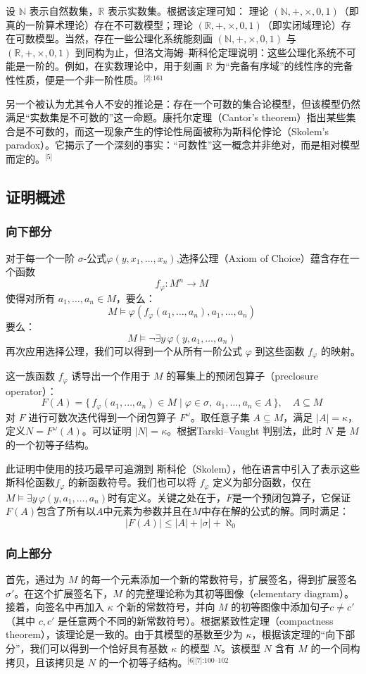 设 \(\mathbb{N}\) 表示自然数集，\(\mathbb{R}\) 表示实数集。根据该定理可知：
理论 \((\mathbb{N}, +, \times, 0, 1)\)（即真的一阶算术理论）存在不可数模型；理论 \((\mathbb{R}, +, \times, 0, 1)\)（即实闭域理论）存在可数模型。当然，存在一些公理化系统能刻画 \((\mathbb{N}, +, \times, 0, 1)\) 与 \((\mathbb{R}, +, \times, 0, 1)\) 到同构为止，但洛文海姆–斯科伦定理说明：这些公理化系统不可能是一阶的。例如，在实数理论中，用于刻画 \(\mathbb{R}\) 为“完备有序域”的线性序的完备性性质，便是一个非一阶性质。\(^\text{[2]:161}\)

另一个被认为尤其令人不安的推论是：存在一个可数的集合论模型，但该模型仍然满足“实数集是不可数的”这一命题。康托尔定理（Cantor’s theorem）指出某些集合是不可数的，而这一现象产生的悖论性局面被称为斯科伦悖论（Skolem’s paradox）。它揭示了一个深刻的事实：“可数性”这一概念并非绝对，而是相对模型而定的。\(^\text{[5]}\)
\subsection{证明概述}
\subsubsection{向下部分}
对于每一个一阶 \(\sigma\)-公式\(\varphi(y, x_1, \ldots, x_n)\),选择公理（Axiom of Choice）蕴含存在一个函数  
\[
f_\varphi : M^n \to M~
\]
使得对所有 \(a_1, \ldots, a_n \in M\)，要么：
\[
M \models \varphi(f_\varphi(a_1, \ldots, a_n), a_1, \ldots, a_n)~
\]
要么：
\[
M \models \neg \exists y \, \varphi(y, a_1, \ldots, a_n)~
\]
再次应用选择公理，我们可以得到一个从所有一阶公式 \(\varphi\) 到这些函数 \(f_\varphi\) 的映射。

这一族函数 \(f_\varphi\) 诱导出一个作用于 \(M\) 的幂集上的预闭包算子（preclosure operator）：
\[
F(A) = \{\, f_\varphi(a_1, \ldots, a_n) \in M \mid 
\varphi \in \sigma, \; a_1, \ldots, a_n \in A \,\},
\quad A \subseteq M~
\]
对 \(F\) 进行可数次迭代得到一个闭包算子 \(F^\omega\)。取任意子集 \(A \subseteq M\)，满足 \(|A| = \kappa\)，定义\(N = F^\omega(A)\)。可以证明 \(|N| = \kappa\)。根据Tarski–Vaught 判别法，此时 \(N\) 是 \(M\) 的一个初等子结构。

此证明中使用的技巧最早可追溯到 斯科伦（Skolem），他在语言中引入了表示这些斯科伦函数\(f_\varphi\) 的新函数符号。我们也可以将 \(f_\varphi\) 定义为部分函数，仅在
\(M \models \exists y\, \varphi(y, a_1, \ldots, a_n)\)时有定义。关键之处在于，\(F\)是一个预闭包算子，它保证\(F(A)\)包含了所有以\(A\)中元素为参数并且在\(M\)中存在解的公式的解。同时满足：
\[
|F(A)| \le |A| + |\sigma| + \aleph_0~
\]
\subsubsection{向上部分}
首先，通过为 \(M\) 的每一个元素添加一个新的常数符号，扩展签名，得到扩展签名 \(\sigma'\)。在这个扩展签名下，\(M\) 的完整理论称为其初等图像（elementary diagram）。接着，向签名中再加入 \(\kappa\) 个新的常数符号，并向 \(M\) 的初等图像中添加句子\(c \neq c'\)（其中 \(c, c'\) 是任意两个不同的新常数符号）。根据紧致性定理（compactness theorem），该理论是一致的。由于其模型的基数至少为 \(\kappa\)，根据该定理的“向下部分”，我们可以得到一个恰好具有基数 \(\kappa\) 的模型 \(N\)。该模型 \(N\) 含有 \(M\) 的一个同构拷贝，且该拷贝是 \(N\) 的一个初等子结构。\(^\text{[6][7]:100–102}\)

